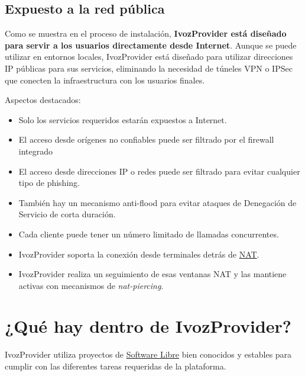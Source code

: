 \documentclass[letterpaper,10pt,spanish]{sphinxmanual}
\begin{document}
\subsection{Expuesto a la red pública}
\label{basic_concepts/intro/what_is_ivozprovider:exposed-to-the-public-network}\label{basic_concepts/intro/what_is_ivozprovider:exposed}
Como se muestra en el proceso de instalación, \textbf{IvozProvider está diseñado para servir a los usuarios directamente desde Internet}. Aunque se puede utilizar en entornos locales, IvozProvider está diseñado para utilizar direcciones IP públicas para sus servicios, eliminando la necesidad de túneles VPN o IPSec que conecten la infraestructura con los usuarios finales.

Aspectos destacados:
\begin{itemize}
\item {} 
Solo los servicios requeridos estarán expuestos a Internet.

\item {} 
El acceso desde orígenes no confiables puede ser filtrado por el firewall integrado

\item {} 
El acceso desde direcciones IP o redes puede ser filtrado para evitar cualquier tipo de phishing.

\item {} 
También hay un mecanismo anti-flood para evitar ataques de Denegación de Servicio de corta duración.

\item {} 
Cada cliente puede tener un número limitado de llamadas concurrentes.

\item {} 
IvozProvider soporta la conexión desde terminales detrás de \href{https://en.wikipedia.org/wiki/Network\_address\_translation}{NAT}.

\item {} 
IvozProvider realiza un seguimiento de esas ventanas NAT y las mantiene activas con mecanismos de \emph{nat-piercing}.

\end{itemize}


\section{¿Qué hay dentro de IvozProvider?}
\label{basic_concepts/intro/what_is_inside::doc}\label{basic_concepts/intro/what_is_inside:what-is-inside-ivozprovider}
IvozProvider utiliza proyectos de \href{https://www.gnu.org/philosophy/free-sw.en.html}{Software Libre} bien conocidos y estables para cumplir con las diferentes tareas requeridas de la plataforma.
\end{document}
